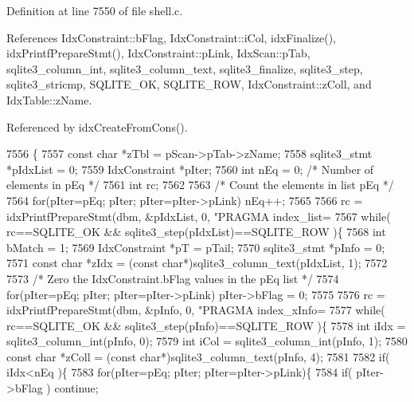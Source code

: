 Definition at line 7550 of file shell.\+c.



References Idx\+Constraint\+::b\+Flag, Idx\+Constraint\+::i\+Col, idx\+Finalize(), idx\+Printf\+Prepare\+Stmt(), Idx\+Constraint\+::p\+Link, Idx\+Scan\+::p\+Tab, sqlite3\+\_\+column\+\_\+int, sqlite3\+\_\+column\+\_\+text, sqlite3\+\_\+finalize, sqlite3\+\_\+step, sqlite3\+\_\+stricmp, S\+Q\+L\+I\+T\+E\+\_\+\+OK, S\+Q\+L\+I\+T\+E\+\_\+\+R\+OW, Idx\+Constraint\+::z\+Coll, and Idx\+Table\+::z\+Name.



Referenced by idx\+Create\+From\+Cons().


\begin{DoxyCode}
7556  \{
7557   \textcolor{keyword}{const} \textcolor{keywordtype}{char} *zTbl = pScan->pTab->zName;
7558   sqlite3_stmt *pIdxList = 0;
7559   IdxConstraint *pIter;
7560   \textcolor{keywordtype}{int} nEq = 0;                    \textcolor{comment}{/* Number of elements in pEq */}
7561   \textcolor{keywordtype}{int} rc;
7562 
7563   \textcolor{comment}{/* Count the elements in list pEq */}
7564   \textcolor{keywordflow}{for}(pIter=pEq; pIter; pIter=pIter->pLink) nEq++;
7565 
7566   rc = idxPrintfPrepareStmt(dbm, &pIdxList, 0, \textcolor{stringliteral}{"PRAGMA index\_list=%
7567   \textcolor{keywordflow}{while}( rc==SQLITE_OK && sqlite3_step(pIdxList)==SQLITE_ROW )\{
7568     \textcolor{keywordtype}{int} bMatch = 1;
7569     IdxConstraint *pT = pTail;
7570     sqlite3_stmt *pInfo = 0;
7571     \textcolor{keyword}{const} \textcolor{keywordtype}{char} *zIdx = (\textcolor{keyword}{const} \textcolor{keywordtype}{char}*)sqlite3_column_text(pIdxList, 1);
7572 
7573     \textcolor{comment}{/* Zero the IdxConstraint.bFlag values in the pEq list */}
7574     \textcolor{keywordflow}{for}(pIter=pEq; pIter; pIter=pIter->pLink) pIter->bFlag = 0;
7575 
7576     rc = idxPrintfPrepareStmt(dbm, &pInfo, 0, \textcolor{stringliteral}{"PRAGMA index\_xInfo=%
7577     \textcolor{keywordflow}{while}( rc==SQLITE_OK && sqlite3_step(pInfo)==SQLITE_ROW )\{
7578       \textcolor{keywordtype}{int} iIdx = sqlite3_column_int(pInfo, 0);
7579       \textcolor{keywordtype}{int} iCol = sqlite3_column_int(pInfo, 1);
7580       \textcolor{keyword}{const} \textcolor{keywordtype}{char} *zColl = (\textcolor{keyword}{const} \textcolor{keywordtype}{char}*)sqlite3_column_text(pInfo, 4);
7581 
7582       \textcolor{keywordflow}{if}( iIdx<nEq )\{
7583         \textcolor{keywordflow}{for}(pIter=pEq; pIter; pIter=pIter->pLink)\{
7584           \textcolor{keywordflow}{if}( pIter->bFlag ) \textcolor{keywordflow}{continue};
}}
\end{DoxyCode}
